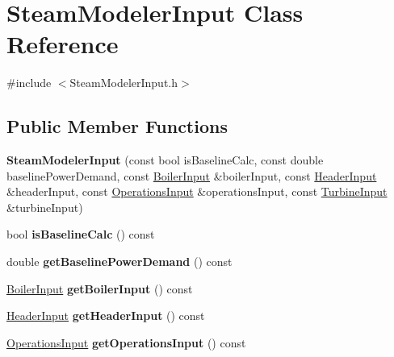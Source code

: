 \hypertarget{class_steam_modeler_input}{}\section{Steam\+Modeler\+Input Class Reference}
\label{class_steam_modeler_input}


{\ttfamily \#include $<$Steam\+Modeler\+Input.\+h$>$}

\subsection*{Public Member Functions}
\begin{DoxyCompactItemize}
\item 
\mbox{\label{class_steam_modeler_input_a239f096d7485171f555031289349c681}} 
{\bfseries Steam\+Modeler\+Input} (const bool is\+Baseline\+Calc, const double baseline\+Power\+Demand, const \hyperlink{class_boiler_input}{Boiler\+Input} \&boiler\+Input, const \hyperlink{class_header_input}{Header\+Input} \&header\+Input, const \hyperlink{class_operations_input}{Operations\+Input} \&operations\+Input, const \hyperlink{class_turbine_input}{Turbine\+Input} \&turbine\+Input)
\item 
\mbox{\label{class_steam_modeler_input_ac4122e6a8b606181260f2cd5e2951345}} 
bool {\bfseries is\+Baseline\+Calc} () const
\item 
\mbox{\label{class_steam_modeler_input_a42f256f493a27def4822f39dce05dd16}} 
double {\bfseries get\+Baseline\+Power\+Demand} () const
\item 
\mbox{\label{class_steam_modeler_input_a6582aa30956b3b633658bbfb6d95487f}} 
\hyperlink{class_boiler_input}{Boiler\+Input} {\bfseries get\+Boiler\+Input} () const
\item 
\mbox{\label{class_steam_modeler_input_af0850a10ee75b1f5515a4ad4439167d3}} 
\hyperlink{class_header_input}{Header\+Input} {\bfseries get\+Header\+Input} () const
\item 
\mbox{\label{class_steam_modeler_input_a913796b30c4b12838a5ddd375933e0c0}} 
\hyperlink{class_operations_input}{Operations\+Input} {\bfseries get\+Operations\+Input} () const

\end{DoxyCompactItemize}
